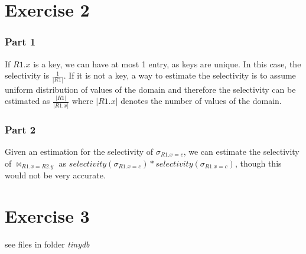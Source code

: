 \documentclass[11pt,a4paper]{scrartcl}
\begin{document}
\section*{Exercise 2}

\subsubsection*{Part 1}

If $R1.x$ is a key, we can have at most 1 entry, as keys are unique. In this case, the selectivity is $\frac{1}{|R1|}$. If it is not a key, a way to estimate the selectivity is to assume uniform distribution of values of the domain and therefore the selectivity can be estimated as $\frac{|R1|}{|R1.x|}$ where $|R1.x|$ denotes the number of values of the domain.

\subsubsection*{Part 2}

Given an estimation for the selectivity of $\sigma_{R1.x=c}$, we can estimate the selectivity of $\Join_{R1.x=R2.y}$ as $selectivity(\sigma_{R1.x=c})*selectivity(\sigma_{R1.x=c})$, though this would not be very accurate.

\section*{Exercise 3}

see files in folder \textit{tinydb}
\end{document}
